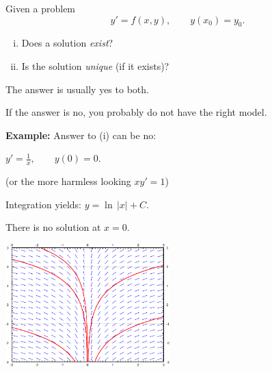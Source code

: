 \documentclass[10pt,aspectratio=169]{beamer}
\begin{document}
\begin{frame}
Given a problem
\begin{equation*}
y' = f(x,y), \qquad y(x_0) = y_0.
\end{equation*}
\begin{enumerate}[(i)]
\item\pause Does a solution \emph{exist}?
\item\pause Is the solution \emph{unique} (if it exists)?
\end{enumerate}

\medskip
\pause

The answer is usually yes to both.

\pause
If the answer is no, you probably do not have the right model.

\medskip
\pause

\textbf{Example:}
Answer to (i) can be no:

\quad $y' = \frac{1}{x}, \qquad y(0) = 0$.

\pause (or the more harmless
looking $x y' = 1$)

\medskip
\pause

Integration yields: $y = \ln \, \lvert x \rvert + C$. \quad

\pause
There is no solution at $x=0$.

\vspace*{-68pt}
\hspace*{3in}\includegraphics[width=2.5in]{../figures/1-3-xinv-sol}

\end{frame}
\end{document}
